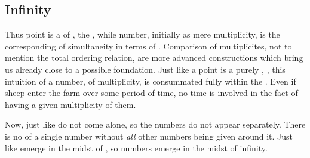 \subsection{Infinity} %

\pa Thus point is a  of , the , while number, initially as mere multiplicity, is the corresponding
 of simultaneity in terms of .  Comparison
of multiplicites, not to mention the total ordering relation, are more advanced
constructions which bring us already close to a possible foundation. Just like a
point is a purely , , this intuition of a
number, of multiplicity, is consummated fully within the \hoa. Even if sheep
enter the farm over some period of time, no time is involved in the fact of
having a given multiplicity of them.

Now, just like  do not come alone, so the numbers do not appear
separately. There is no  of a single number without {\em all}
other numbers being given around it. Just like  emerge in the
midst of , so numbers emerge in the midst of infinity.

